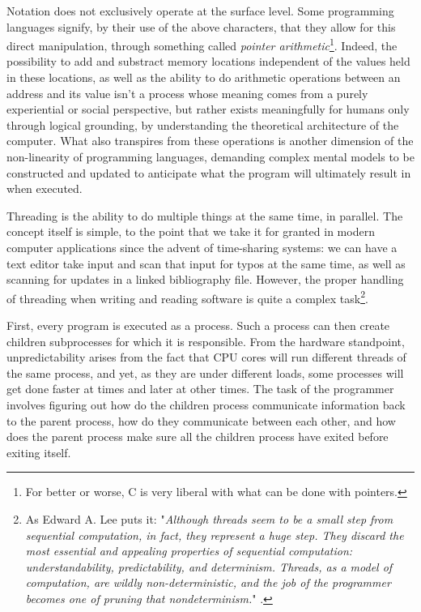 Notation does not exclusively operate at the surface level. Some programming languages signify, by their use of the above characters, that they allow for this direct manipulation, through something called \emph{pointer arithmetic}\footnote{For better or worse, C is very liberal with what can be done with pointers.}. Indeed, the possibility to add and substract memory locations independent of the values held in these locations, as well as the ability to do arithmetic operations between an address and its value isn't a process whose meaning comes from a purely experiential or social perspective, but rather exists meaningfully for humans only through logical grounding, by understanding the theoretical architecture of the computer. What also transpires from these operations is another dimension of the non-linearity of programming languages, demanding complex mental models to be constructed and updated to anticipate what the program will ultimately result in when executed.

Threading is the ability to do multiple things at the same time, in parallel. The concept itself is simple, to the point that we take it for granted in modern computer applications since the advent of time-sharing systems: we can have a text editor take input and scan that input for typos at the same time, as well as scanning for updates in a linked bibliography file. However, the proper handling of threading when writing and reading software is quite a complex task\footnote{As Edward A. Lee puts it: "\emph{Although threads seem to be a small step from sequential computation, in fact, they represent a huge step. They discard the most essential and appealing properties of sequential computation: understandability, predictability, and determinism. Threads, as a model of computation, are wildly non-deterministic, and the job of the programmer becomes one of pruning that nondeterminism.}" \citep{lee_problem_2006}.}.

First, every program is executed as a process. Such a process can then create children subprocesses for which it is responsible. From the hardware standpoint, unpredictability arises from the fact that CPU cores will run different threads of the same process, and yet, as they are under different loads, some processes will get done faster at times and later at other
times. The task of the programmer involves figuring out how do the children process communicate information back to the parent process, how do they communicate between each other, and how does the parent process make sure all the children process have exited before exiting itself.

